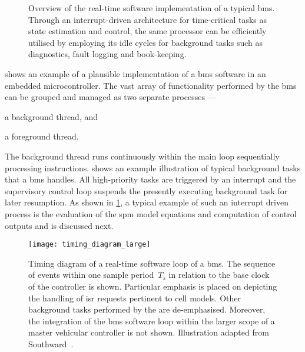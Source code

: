\begin{figure}[!tbp]
{\begin{subfigure}[t]{\wd\algboxA}
            \usebox{\algboxA}
        \end{subfigure}
        \hfill
        \begin{subfigure}[t]{\wd\algboxB}
            \label{subfig:fgRTprocess}
            \raisebox{\dimexpr.5\ht\algboxA-.5\ht\algboxB}{%
                \usebox{\algboxB}%
            }%
        \end{subfigure}
    }
    \caption[Overview of real-time software implementation of a typical
    ]{Overview of the real-time software implementation of a typical
        \gls{bms}. Through an interrupt-driven architecture for time-critical tasks as
        state estimation and control, the same processor can be
        efficiently utilised by employing its idle  cycles for background
    tasks such as diagnostics, fault logging and book-keeping.}
    \label{fig:basicRTCsoftwarearch}
\end{figure}

 shows  an example of a  plausible implementation
of  a \gls{bms}  software  in an  embedded microcontroller.  The  vast array  of
functionality  performed by  the \gls{bms}  can be  grouped and  managed as  two
separate processes ---
\begin{enumerate*}[label=\roman*)]
    \item a background thread, and
    \item a foreground thread.
\end{enumerate*}
The  background  thread runs  continuously  within  the main  loop  sequentially
processing instructions.  shows an example illustration
of typical  background tasks that  a \gls{bms} handles. All  high-priority tasks
are  triggered  by  an  interrupt  and the  supervisory  control  loop  suspends
the  presently executing  background  task  for later  resumption.  As shown  in
\cref{subfig:fgRTprocess}, a typical example of such an interrupt driven process
is the  evaluation of the \gls{spm}  model equations and computation  of control
outputs and is discussed next.

\begin{figure}[!tbp]
    \centering
    \texttt{[image: timing\_diagram\_large]}
    \caption[Timing diagram of a real-time software loop of a ]
    {Timing diagram of a real-time software loop of a \gls{bms}. The sequence of
        events within one sample period~$T_s$ in relation to the base clock of
        the controller is shown. Particular emphasis is placed on depicting the
        handling of \gls{isr} requests pertinent to cell models. Other
        background tasks performed by the  are de-emphasised. Moreover, the
        integration of the  \gls{bms} software loop within  the larger  scope of
        a master  vehicular controller is not shown. Illustration adapted from
    Southward~\cite{Southward2011}.}
    \label{fig:timingdiagramBig}
\end{figure}



